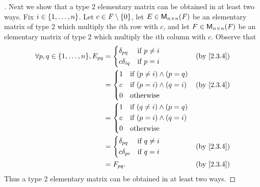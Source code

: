 \begin{proof}[]
  Next we show that a type 2 elementary matrix can be obtained in at least two ways.
  Fix \(i \in \left\lbrace1, \dots, n\right\rbrace\).
  Let \(c \in \mathit{F} \setminus \left\lbrace0\right\rbrace\), let \(E \in \ms[n][n][\F]\) be an elementary matrix of type 2 which multiply the \(i\)th row with \(c\), and let \(F \in \ms[n][n][\F]\) be an elementary matrix of type 2 which multiply the \(i\)th column with \(c\).
  Observe that
  \begin{align*}
    \forall p, q \in \set{1, \dots, n}, E_{p q} & = \begin{dcases}
                                                      \delta_{p q}   & \text{if } p \neq i \\
                                                      c \delta_{i q} & \text{if } p = i
                                                    \end{dcases}    &  & \by{2.3.4}                     \\
                                                & = \begin{dcases}
                                                      1 & \text{if } (p \neq i) \land (p = q) \\
                                                      c & \text{if } (p = i) \land (q = i)    \\
                                                      0 & \text{otherwise}
                                                    \end{dcases} &  & \by{2.3.4}                  \\
                                                & = \begin{dcases}
                                                      1 & \text{if } (q \neq i) \land (p = q) \\
                                                      c & \text{if } (p = i) \land (q = i)    \\
                                                      0 & \text{otherwise}
                                                    \end{dcases}                  \\
                                                & = \begin{dcases}
                                                      \delta_{p q}   & \text{if } q \neq i \\
                                                      c \delta_{p i} & \text{if } q = i
                                                    \end{dcases}    &  & \by{2.3.4}                     \\
                                                & = F_{p q}.                                 &  & \by{2.3.4}
  \end{align*}
  Thus a type 2 elementary matrix can be obtained in at least two ways.


\end{proof}
